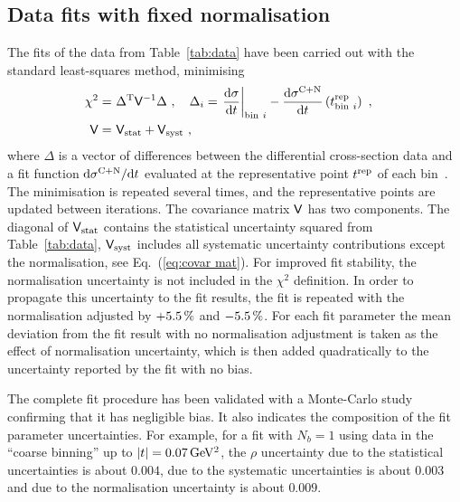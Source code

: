 \subsection{Data fits with fixed normalisation}
\label{sec:rho anal}

The fits of the data from Table~\ref{tab:data} have been carried out with the standard least-squares method, minimising
\begin{equation}
\label{eq:chi sq A}
	\begin{aligned}
		\chi^2 =\ & \Delta^{\rm T} \mathsf{V}^{-1} \Delta\ ,\quad
			\Delta_i = \left.{{\rm d}\sigma\over {\rm d} t}\right|_{{\rm bin}\ i} - {{\rm d}\sigma^{\rm C+N}\over{\rm d} t}\left(t^{\rm rep}_{{\rm bin}\ i}\right)\ ,\cr
		\mathsf{V} =\ & \mathsf{V}_{\rm stat} + \mathsf{V}_{\rm syst}\ ,\cr
	\end{aligned}
\end{equation}
where $\Delta$ is a vector of differences between the differential cross-section data and a fit function ${\rm d}\sigma^{\rm C+N}/{\rm d} t$ evaluated at the representative point $t^{\rm rep}$ of each bin~\cite{lafferty94}. The minimisation is repeated several times, and the representative points are updated between iterations. The covariance matrix $\mathsf{V}$ has two components. The diagonal of $\mathsf{V}_{\rm stat}$ contains the statistical uncertainty squared from Table~\ref{tab:data}, $\mathsf{V}_{\rm syst}$ includes all systematic uncertainty contributions except the normalisation, see Eq.~(\ref{eq:covar mat}). For improved fit stability, the normalisation uncertainty is not included in the $\chi^2$ definition. In order to propagate this uncertainty to the fit results, the fit is repeated with the normalisation adjusted by $+5.5\,{\rm \%}$ and $-5.5\,{\rm \%}$. For each fit parameter the mean deviation from the fit result with no normalisation adjustment is taken as the effect of normalisation uncertainty, which is then added quadratically to the uncertainty reported by the fit with no bias.

The complete fit procedure has been validated with a Monte-Carlo study confirming that it has negligible bias. It also indicates the composition of the fit parameter uncertainties. For example, for a fit with $N_b = 1$ using data in the ``coarse binning'' up to $|t| = 0.07\,{\rm GeV^2}$, the $\rho$ uncertainty due to the statistical uncertainties is about $0.004$, due to the systematic uncertainties is about $0.003$ and due to the normalisation uncertainty is about $0.009$.

